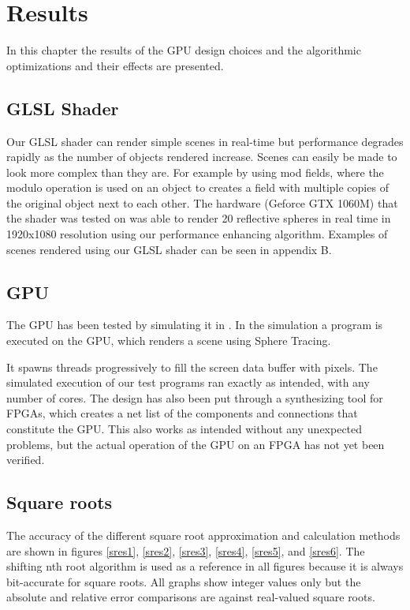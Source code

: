 \chapter{Results}

	In this chapter the results of the GPU design choices and the algorithmic
	optimizations and their effects are presented.

	\section{GLSL Shader}

		Our GLSL shader can render simple scenes in real-time but performance
		degrades rapidly as the number of objects rendered increase. Scenes can
		easily be made to look more complex than they are. For example by using mod
		fields, where the modulo operation is used on an object to creates a field
		with multiple copies of the original object next to each other. The
		hardware (Geforce GTX 1060M) that the shader was tested on was able to
		render 20 reflective spheres in real time in 1920x1080 resolution using our
		performance enhancing algorithm. Examples of scenes rendered using our 
		GLSL
		shader can be seen in appendix B.
 
	\section{GPU}
	
		The GPU has been tested by simulating it in \clash. In the simulation a
		program is executed on the GPU, which renders a scene using Sphere
		Tracing. 

		It spawns threads progressively to fill the screen data buffer with pixels.
		The simulated execution of our test programs ran exactly as intended, with
		any number of cores. The design has also been put through a synthesizing
		tool for FPGAs, which creates a net list of the components and connections
		that constitute the GPU. This also works as intended without any unexpected
		problems, but the actual operation of the GPU on an FPGA has not yet been
		verified.
	
	\section{Square roots}
		
		The accuracy of the different square root approximation and calculation
		methods are shown in figures \ref{sres1}, \ref{sres2}, \ref{sres3},
		\ref{sres4}, \ref{sres5}, and \ref{sres6}. The shifting nth root
		algorithm is used as a reference in all figures because it is always
		bit-accurate for square roots. All graphs show integer values only but the
		absolute and relative error comparisons are against real-valued square
		roots.

